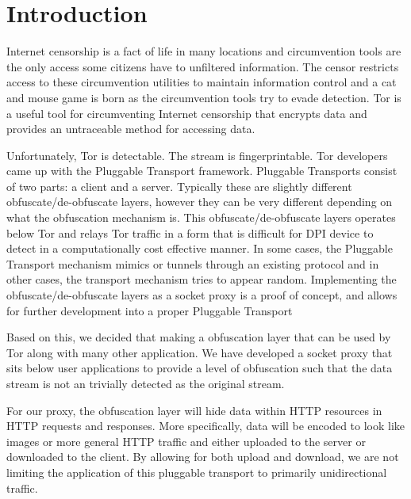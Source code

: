\section{Introduction}
Internet censorship is a fact of life in many locations and circumvention tools are the only access some citizens have to unfiltered information. The censor restricts access to these circumvention utilities to maintain information control and a cat and mouse game is born as the circumvention tools try to evade detection. Tor is a useful tool for circumventing Internet censorship that encrypts data and provides an untraceable method for accessing data. 

Unfortunately, Tor is detectable. The stream is fingerprintable. Tor developers came up with the Pluggable Transport framework\cite{Ref1}.
Pluggable Transports consist of two parts: a client and a server. Typically these are slightly different obfuscate/de-obfuscate layers, however they can be very different depending on what the obfuscation mechanism is. This obfuscate/de-obfuscate layers operates below Tor and relays Tor traffic in a form that is difficult for DPI device to detect in a computationally cost effective manner. In some cases, the Pluggable Transport mechanism mimics or tunnels through an existing protocol\cite{Ref2,Ref3} and in other cases, the transport mechanism tries to appear random\cite{Ref4}. Implementing the obfuscate/de-obfuscate layers as a socket proxy is a proof of concept, and allows for further development into a proper Pluggable Transport

Based on this, we decided that making a obfuscation layer that can be used by Tor along with many other application. We have developed a socket proxy that sits below user applications to provide a level of obfuscation such that the data stream is not an trivially detected as the original stream. 

For our proxy, the obfuscation layer will hide data within HTTP resources in HTTP requests and responses. More specifically, data will be encoded to look like images or more general HTTP traffic and either uploaded to the server or downloaded to the client. By allowing for both upload and download, we are not limiting the application of this pluggable transport to primarily unidirectional traffic. %
